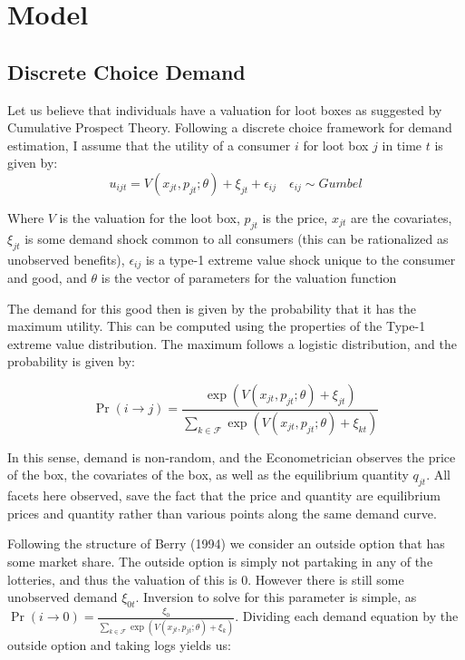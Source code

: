 \documentclass[12pt]{paper}
\begin{document}
\section{Model}

\subsection{Discrete Choice Demand}



Let us believe that individuals have a valuation for loot boxes as
suggested by Cumulative Prospect Theory. Following a discrete choice
framework for demand estimation, I assume that the utility of a
consumer $i$ for loot box $j$ in time $t$ is given by:
\begin{equation*}
  u_{ijt} = V( x_{jt}, p_{jt}; \theta ) + \xi_{jt} + \epsilon_{ij} \quad \epsilon_{ij} \sim Gumbel
\end{equation*}

Where $V$ is the valuation for the loot box, $p_{jt}$ is the price,
$x_{jt}$ are the covariates, $\xi_{jt}$ is some demand shock common to
all consumers (this can be rationalized as unobserved benefits), 
$\epsilon_{ij}$ is a type-1 extreme value shock unique to the consumer and
good, and $\theta$ is the vector of parameters for the valuation function

The demand for this good then is given by the probability that it has
the maximum utility. This can be computed using the properties of the
Type-1 extreme value distribution. The maximum follows a logistic
distribution, and the probability is given by:

\begin{equation*}
  \Pr( i \rightarrow j ) = \frac{\exp( V(x_{jt},p_{jt} ; \theta) + \xi_{jt})}{ \sum_{k \in \mathcal{F}}
    \exp(V(x_{jt},p_{jt}; \theta) + \xi_{kt})}
\end{equation*}

In this sense, demand is non-random, and the Econometrician observes
the price of the box, the covariates of the box, as well as the
equilibrium quantity $q_{jt}$. All facets here observed, save the fact
that the price and quantity are equilibrium prices and quantity rather
than various points along the same demand curve.

Following the structure of Berry (1994) we consider an outside option
that has some market share. The outside option is simply not partaking
in any of the lotteries, and thus the valuation of this is $0$.
However there is still some unobserved demand $\xi_{0t}$. Inversion to
solve for this parameter is simple, as
$\Pr( i \rightarrow 0) = \frac{\xi_0}{ \sum_{k \in \mathcal{F}} \exp(V(x_{jt},p_{jt}; \theta) +
  \xi_k)}$.  Dividing each demand equation by the outside option and
taking logs yields us:
\end{document}
